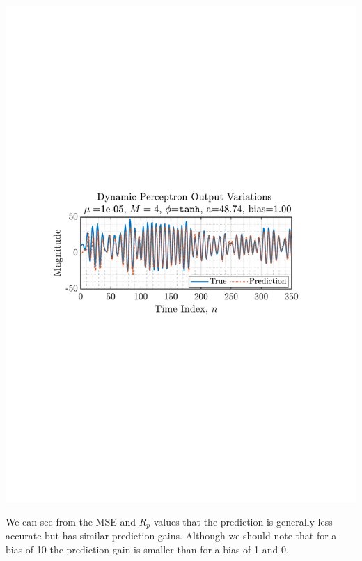 \documentclass[12pt]{article}
\begin{document}
		\begin{minipage}[b]{0.49\textwidth}
			\centering
			\includegraphics[trim={2.2cm 11.2cm 3.15cm  11.2cm}, clip, width=\textwidth]{../MATLAB/figures/q4_4_fig01.pdf} 
			\captionsetup{justification=centering}
			\label{fig: 4-4}
		\end{minipage}%
	
		We can see from the MSE and $R_p$ values that the prediction is generally less accurate but has similar prediction gains. Although we should note that for a bias of 10 the prediction gain is smaller than for a bias of 1 and 0.
\end{document}
